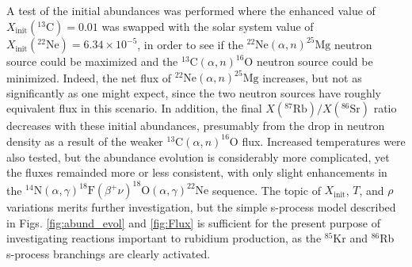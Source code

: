 A test of the initial abundances was performed where the enhanced value of $X_{\mathrm{init}}(^{13}\mathrm{C}) = 0.01$ was swapped with the solar system value of $X_{\mathrm{init}}(^{22}\mathrm{Ne}) = 6.34 \times 10^{-5}$, in order to see if the $^{22}\mathrm{Ne}(\alpha,n)^{25}\mathrm{Mg}$ neutron source could be maximized and the $^{13}\mathrm{C}(\alpha,n)^{16}\mathrm{O}$ neutron source could be minimized. Indeed, the net flux of $^{22}\mathrm{Ne}(\alpha,n)^{25}\mathrm{Mg}$ increases, but not as significantly as one might expect, since the two neutron sources have roughly equivalent flux in this scenario. In addition, the final $X(^{87}\mathrm{Rb})/X(^{86}\mathrm{Sr})$ ratio decreases with these initial abundances, presumably from the drop in neutron density as a result of the weaker $^{13}\mathrm{C}(\alpha,n)^{16}\mathrm{O}$ flux. Increased temperatures were also tested, but the abundance evolution is considerably more complicated, yet the fluxes remainded more or less consistent, with only slight enhancements in the $^{14}\mathrm{N}(\alpha,\gamma)^{18}\mathrm{F}(\beta^{+}\nu)^{18}\mathrm{O}(\alpha,\gamma)^{22}\mathrm{Ne}$ sequence. The topic of $X_{\mathrm{init}}$, $T$, and $\rho$ variations merits further investigation, but the simple s-process model described in Figs. \ref{fig:abund_evol} and \ref{fig:Flux} is sufficient for the present purpose of investigating reactions important to rubidium production, as the $^{85}$Kr and $^{86}$Rb s-process branchings are clearly activated.

